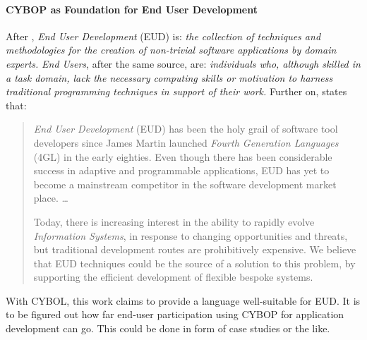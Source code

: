 %
%
%
%
%
%
%

\paragraph{CYBOP as Foundation for End User Development}
\label{end_user_development_heading}

After \cite{eudnet}, \emph{End User Development} (EUD) is: \textit{the
collection of techniques and methodologies for the creation of non-trivial
software applications by domain experts.} \emph{End Users}, after the same
source, are: \textit{individuals who, although skilled in a task domain, lack
the necessary computing skills or motivation to harness traditional programming
techniques in support of their work.} Further on, \cite{eudnet} states that:

\begin{quote}
    \emph{End User Development} (EUD) has been the holy grail of software tool
    developers since James Martin launched \emph{Fourth Generation Languages}
    (4GL) in the early eighties. Even though there has been considerable
    success in adaptive and programmable applications, EUD has yet to become a
    mainstream competitor in the software development market place. \ldots

    Today, there is increasing interest in the ability to rapidly evolve
    \emph{Information Systems}, in response to changing opportunities and
    threats, but traditional development routes are prohibitively expensive.
    We believe that EUD techniques could be the source of a solution to this
    problem, by supporting the efficient development of flexible bespoke
    systems.
\end{quote}

With CYBOL, this work claims to provide a language well-suitable for EUD. It is
to be figured out how far end-user participation using CYBOP for application
development can go. This could be done in form of case studies or the like.
